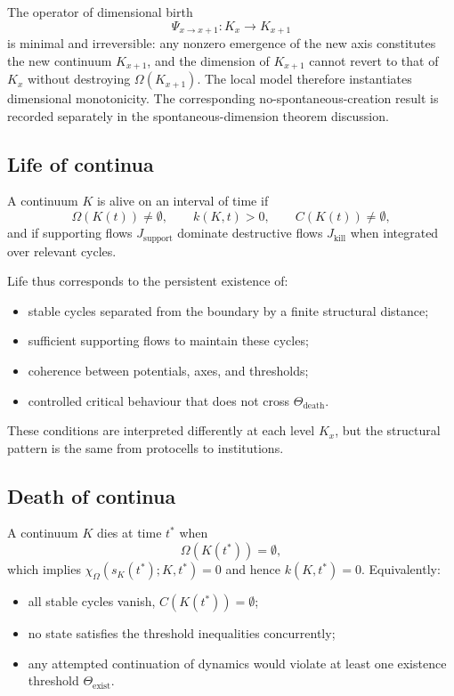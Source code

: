 The operator of dimensional birth
\[
    \Psi_{x\to x+1}: K_x \to K_{x+1}
\]
is minimal and irreversible: any nonzero emergence of the new axis constitutes the new continuum \(K_{x+1}\), and the dimension of \(K_{x+1}\) cannot revert to that of \(K_x\) without destroying \(\Omega(K_{x+1})\).
The local model therefore instantiates dimensional monotonicity. The
corresponding no-spontaneous-creation result is recorded separately in
the spontaneous-dimension theorem discussion.

\subsection{Life of continua}

A continuum \(K\) is alive on an interval of time if
\[
    \Omega(K(t)) \neq \emptyset,\qquad
    k(K,t) > 0,\qquad
    C(K(t)) \neq \emptyset,
\]
and if supporting flows \(J_{\mathrm{support}}\) dominate destructive flows \(J_{\mathrm{kill}}\) when integrated over relevant cycles.

Life thus corresponds to the persistent existence of:
\begin{itemize}
    \item stable cycles separated from the boundary by a finite structural distance;
    \item sufficient supporting flows to maintain these cycles;
    \item coherence between potentials, axes, and thresholds;
    \item controlled critical behaviour that does not cross \(\Theta_{\mathrm{death}}\).
\end{itemize}

These conditions are interpreted differently at each level \(K_x\), but the structural pattern is the same from protocells to institutions.

\subsection{Death of continua}

A continuum \(K\) dies at time \(t^\ast\) when
\[
    \Omega(K(t^\ast)) = \emptyset,
\]
which implies \(\chi_{\Omega}(s_K(t^\ast);K,t^\ast)=0\) and hence \(k(K,t^\ast)=0\).
Equivalently:
\begin{itemize}
    \item all stable cycles vanish, \(C(K(t^\ast)) = \emptyset\);
    \item no state satisfies the threshold inequalities concurrently;
    \item any attempted continuation of dynamics would violate at least one existence threshold \(\Theta_{\mathrm{exist}}\).
\end{itemize}

